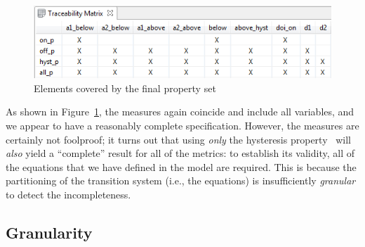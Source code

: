 \begin{figure}
  \centering
  \includegraphics[width=\columnwidth]{figs/spear_set4.png}
  \vspace{-0.1in}
  \caption{Elements covered by the final property set}
  \vspace{-0.1in}
  \label{fig:propertyset4}
\end{figure}

As shown in Figure~\ref{fig:propertyset4}, the measures again coincide and include all variables, and we appear to have a reasonably complete specification.  However, the measures are certainly not foolproof; it turns out that using {\em only} the hysteresis property \hystp\ will {\em also} yield a ``complete'' result for all of the metrics: to establish its validity, all of the equations that we have defined in the model are required.  This is because the partitioning of the transition system (i.e., the equations) is insufficiently {\em granular} to detect the incompleteness.
%

\subsection{Granularity}

